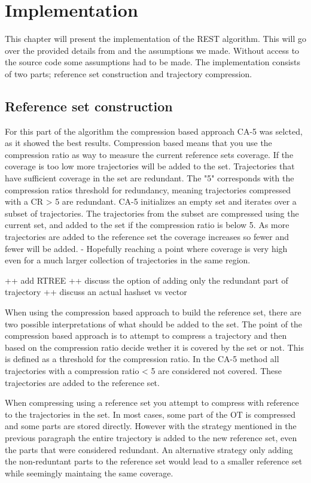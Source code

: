 \chapter{Implementation}

This chapter will present the implementation of the REST algorithm. This will go over the provided details from \cite{zhao2018rest} and the assumptions we made. Without access to the source code some assumptions had to be made. The implementation consists of two parts; reference set construction and trajectory compression.

\section{Reference set construction}
For this part of the algorithm the compression based approach CA-5 was selcted, as it showed the best results. Compression based means that you use the compression ratio as way to measure the current reference sets coverage. If the coverage is too low more trajectories will be added to the set. Trajectories that have sufficient coverage in the set are redundant. The "5" corresponds with the compression ratios threshold for redundancy, meaning trajectories compressed with a CR > 5 are redundant. CA-5 initializes an empty set and iterates over a subset of trajectories. The trajectories from the subset are compressed using the current set, and added to the set if the compression ratio is below 5. As more trajectories are added to the reference set the coverage increases so fewer and fewer will be added. - Hopefully reaching a point where coverage is very high even for a much larger collection of trajectories in the same region.

++ add RTREE
++ discuss the option of adding only the redundant part of trajectory
++ discuss an actual hashset vs vector

When using the compression based approach to build the reference set, there are two possible interpretations of what should be added to the set. The point of the compression based approach is to attempt to compress a trajectory and then based on the compression ratio decide wether it is covered by the set or not. This is defined as a threshold for the compression ratio. In the CA-5 method all trajectories with a compression ratio < 5 are considered not covered. These trajectories are added to the reference set.

When compressing using a reference set you attempt to compress with reference to the trajectories in the set. In most cases, some part of the OT is compressed and some parts are stored directly. However with the strategy mentioned in the previous paragraph the entire trajectory is added to the new reference set, even the parts that were considered redundant. An alternative strategy only adding the non-reduntant parts to the reference set would lead to a smaller reference set while seemingly maintaing the same coverage.


